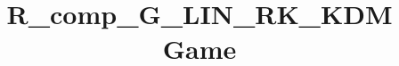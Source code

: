 \documentclass[a3paper]{article}
\title{R_comp_G_LIN_RK_KDM Game}
\theoremstyle{definition}
\begin{document}
\maketitle
\begin{center}

\end{center}
\begin{pchstack}

\pchspace

\pchspace
\end{pchstack}
\end{document}
